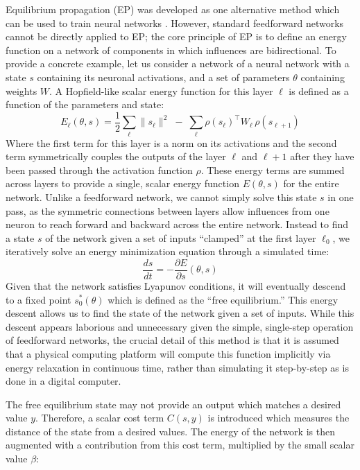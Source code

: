 Equilibrium propagation (EP) was developed as one alternative method which can be used to train neural networks \cite{scellierEquilibriumPropagationBridging2017}. However, standard feedforward networks cannot be directly applied to EP; the core principle of EP is to define an energy function on a network of components in which influences are bidirectional. To provide a concrete example, let us consider a network of a neural network with a state $s$ containing its neuronal activations, and a set of parameters $\theta$ containing weights $W$. A Hopfield-like scalar energy function for this layer $\ell$ is defined as a function of the parameters and state:
\begin{equation}
E_{\ell}(\theta, s) = \frac{1}{2}\sum_{\ell} \|s_\ell\|^2 \;-\; \sum_{\ell} \rho(s_\ell)^\top W_\ell\, \rho(s_{\ell+1})
\end{equation}
Where the first term for this layer is a norm on its activations and the second term symmetrically couples the outputs of the layer $\ell$ and $\ell+1$ after they have been passed through the activation function $\rho$. These energy terms are summed across layers to provide a single, scalar energy function $E(\theta, s)$ for the entire network. Unlike a feedforward network, we cannot simply solve this state $s$ in one pass, as the symmetric connections between layers allow influences from one neuron to reach forward and backward across the entire network. Instead to find a state $s$ of the network given a set of inputs ``clamped'' at the first layer $\ell_0$, we iteratively solve an energy minimization equation through a simulated time:
\begin{equation}
\frac{ds}{dt} = -\frac{\partial E}{\partial s}(\theta, s)
\end{equation}
Given that the network satisfies Lyapunov conditions, it will eventually descend to a fixed point $s_0^*(\theta)$ which is defined as the ``free equilibrium.'' This energy descent allows us to find the state of the network given a set of inputs. While this descent appears laborious and unnecessary given the simple, single-step operation of feedforward networks, the crucial detail of this method is that it is assumed that a physical computing platform will compute this function implicitly via energy relaxation in continuous time, rather than simulating it step-by-step as is done in a digital computer. 

The free equilibrium state may not provide an output which matches a desired value $y$. Therefore, a scalar cost term $C(s,y)$ is introduced which measures the distance of the state from a desired values. The energy of the network is then augmented with a contribution from this cost term, multiplied by the small scalar value $\beta$: 

